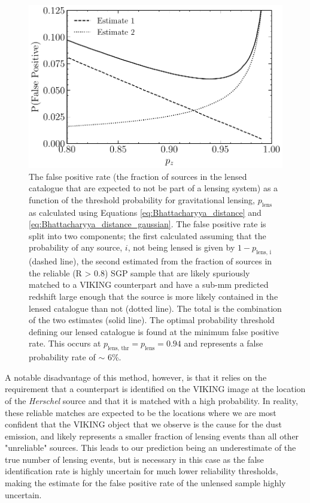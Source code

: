 \begin{figure}
    \centering
    \includegraphics[width=\columnwidth]{Figures/lens_false_positive.pdf}
    \caption{The false positive rate (the fraction of sources in the lensed catalogue that are expected to not be part of a lensing system) as a function of the threshold probability for gravitational lensing, $p_\textrm{lens}$ as calculated using Equations \ref{eq:Bhattacharyya_distance} and \ref{eq:Bhattacharyya_distance_gaussian}. The false positive rate is split into two components; the first calculated assuming that the probability of any source, $i$, not being lensed is given by $1 - p_{\textrm{lens, i}}$ (dashed line), the second estimated from the fraction of sources in the reliable (R > 0.8) SGP sample that are likely spuriously matched to a VIKING counterpart and have a sub-mm predicted redshift large enough that the source is more likely contained in the lensed catalogue than not (dotted line). The total is the combination of the two estimates (solid line). The optimal probability threshold defining our lensed catalogue is found at the minimum false positive rate. This occurs at $p_\textrm{lens, thr} = p_\textrm{lens} = 0.94$ and represents a false probability rate of $\sim$ 6\%.}
    \label{fig:lens_false_positive}
\end{figure}

A notable disadvantage of this method, however, is that it relies on the requirement that a counterpart is identified on the VIKING image at the location of the \textit{Herschel} source and that it is matched with a high probability. In reality, these reliable matches are expected to be the locations where we are most confident that the VIKING object that we observe is the cause for the dust emission, and likely represents a smaller fraction of lensing events than all other "unreliable" sources. This leads to our prediction being an underestimate of the true number of lensing events, but is necessary in this case as the false identification rate is highly uncertain for much lower reliability thresholds, making the estimate for the false positive rate of the unlensed sample highly uncertain.

